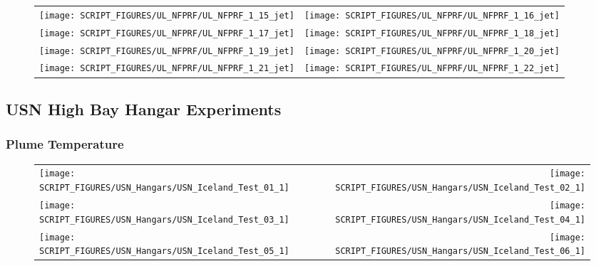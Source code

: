 \begin{figure}[!ht]
\begin{tabular*}{\textwidth}{l@{\extracolsep{\fill}}r}
\texttt{[image: SCRIPT\_FIGURES/UL\_NFPRF/UL\_NFPRF\_1\_15\_jet]} &
\texttt{[image: SCRIPT\_FIGURES/UL\_NFPRF/UL\_NFPRF\_1\_16\_jet]} \\
\texttt{[image: SCRIPT\_FIGURES/UL\_NFPRF/UL\_NFPRF\_1\_17\_jet]} &
\texttt{[image: SCRIPT\_FIGURES/UL\_NFPRF/UL\_NFPRF\_1\_18\_jet]} \\
\texttt{[image: SCRIPT\_FIGURES/UL\_NFPRF/UL\_NFPRF\_1\_19\_jet]} &
\texttt{[image: SCRIPT\_FIGURES/UL\_NFPRF/UL\_NFPRF\_1\_20\_jet]} \\
\texttt{[image: SCRIPT\_FIGURES/UL\_NFPRF/UL\_NFPRF\_1\_21\_jet]} &
\texttt{[image: SCRIPT\_FIGURES/UL\_NFPRF/UL\_NFPRF\_1\_22\_jet]}
\end{tabular*}
\label{UL_NFPRF_jet_3}
\end{figure}

\clearpage

\subsection{USN High Bay Hangar Experiments}

\subsubsection{Plume Temperature}

\begin{figure}[!ht]
\begin{tabular*}{\textwidth}{l@{\extracolsep{\fill}}r}
\texttt{[image: SCRIPT\_FIGURES/USN\_Hangars/USN\_Iceland\_Test\_01\_1]} &
\texttt{[image: SCRIPT\_FIGURES/USN\_Hangars/USN\_Iceland\_Test\_02\_1]} \\
\texttt{[image: SCRIPT\_FIGURES/USN\_Hangars/USN\_Iceland\_Test\_03\_1]} &
\texttt{[image: SCRIPT\_FIGURES/USN\_Hangars/USN\_Iceland\_Test\_04\_1]} \\
\texttt{[image: SCRIPT\_FIGURES/USN\_Hangars/USN\_Iceland\_Test\_05\_1]} &
\texttt{[image: SCRIPT\_FIGURES/USN\_Hangars/USN\_Iceland\_Test\_06\_1]} \\
\end{tabular*}
\label{USN_Plume_Iceland_1}
\end{figure}

\newpage

